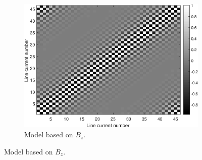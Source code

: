 \begin{figure}[ht]
    \centering
    \begin{subfigure}[b]{0.45\textwidth}
        \includegraphics[width=\textwidth]{fig/corZ.eps}
        \caption{Model based on $B_z$.}
        \label{fig:corZ}
    \end{subfigure}
    

\end{figure}
